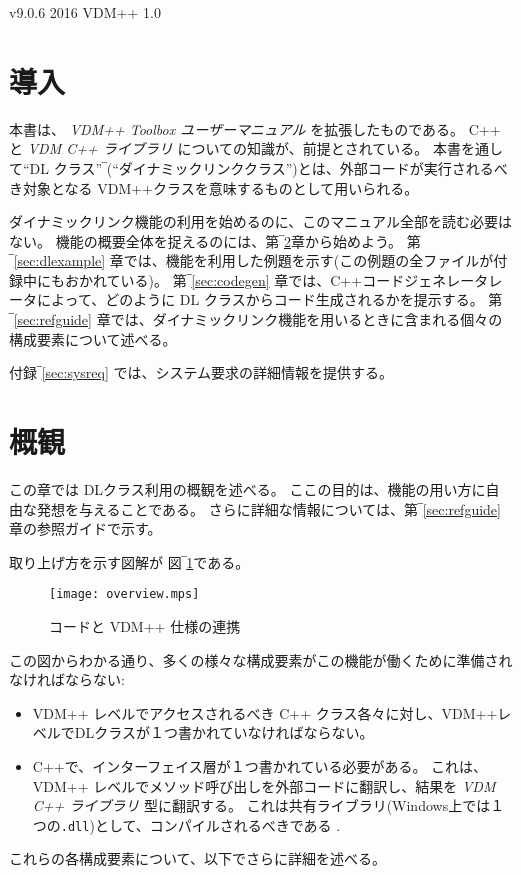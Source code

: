 \documentclass[\pformat,12pt]{jarticle}
\newcommand{\vdmcpplib}{\textit{VDM C++ ライブラリ}}
\begin{document}
       {v9.0.6}
       {2016}
       {VDM++}
       {1.0}


\section{導入}

本書は、 {\it VDM++ Toolbox ユーザーマニュアル} \cite{UserManPP-CSK}を拡張したものである。
C++ \cite{Stroustrup91} と {\vdmcpplib}\cite{LibMan-CSK} についての知識が、前提とされている。
本書を通して``DL クラス''‾(``ダイナミックリンククラス'')とは、外部コードが実行されるべき対象となる VDM++クラスを意味するものとして用いられる。

ダイナミックリンク機能の利用を始めるのに、このマニュアル全部を読む必要はない。
機能の概要全体を捉えるのには、第‾\ref{sec:overview}章から始めよう。
第‾\ref{sec:dlexample} 章では、機能を利用した例題を示す(この例題の全ファイルが付録中にもおかれている)。
第‾\ref{sec:codegen} 章では、C++コードジェネレータレータによって、どのように DL クラスからコード生成されるかを提示する。
第‾\ref{sec:refguide} 章では、ダイナミックリンク機能を用いるときに含まれる個々の構成要素について述べる。

付録‾\ref{sec:sysreq} では、システム要求の詳細情報を提供する。




\section{概観}\label{sec:overview}

この章では DLクラス利用の概観を述べる。 
ここの目的は、機能の用い方に自由な発想を与えることである。
さらに詳細な情報については、第‾\ref{sec:refguide}章の参照ガイドで示す。 

取り上げ方を示す図解が 図‾\ref{idea}である。
\begin{figure}
\begin{center}
\texttt{[image: overview.mps]}
\caption{コードと VDM++ 仕様の連携\label{idea}}
\end{center}
\end{figure}
この図からわかる通り、多くの様々な構成要素がこの機能が働くために準備されなければならない:
\begin{itemize}
\item  VDM++ レベルでアクセスされるべき C++ クラス各々に対し、VDM++レベルでDLクラスが１つ書かれていなければならない。
\item  C++で、インターフェイス層が１つ書かれている必要がある。
これは、 VDM++ レベルでメソッド呼び出しを外部コードに翻訳し、結果を {\vdmcpplib} 型に翻訳する。
これは共有ライブラリ(Windows上では１つの\texttt{.dll})として、コンパイルされるべきである .
\end{itemize}
これらの各構成要素について、以下でさらに詳細を述べる。
\end{document}
